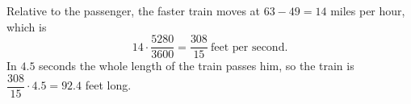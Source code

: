 Relative to the passenger, the faster train moves at $63-49=14$ miles per hour, which is
\[14\cdot\dfrac{5280}{3600}=\dfrac{308}{15}\ \text{feet per second}.\]
In $4.5$ seconds the whole length of the train passes him, so the train is $\dfrac{308}{15}\cdot4.5=\boxed{92.4}$ feet long.
